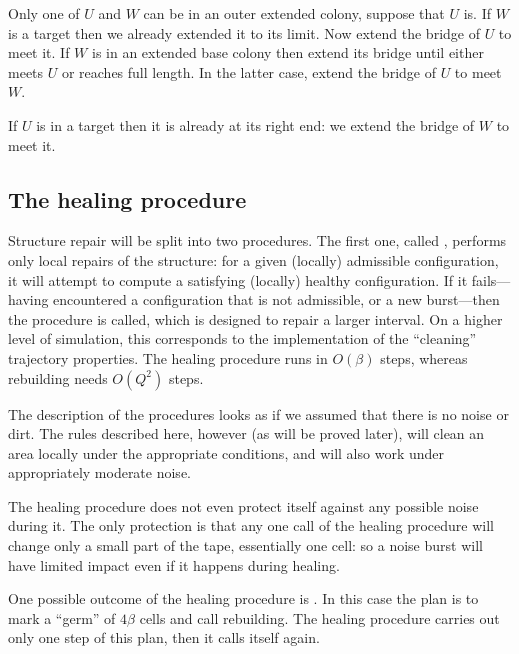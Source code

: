 \documentclass[12pt]{memoir}
\newcommand{\authnote}[3]
{\text{{ \textcolor{#3}{\( \langle\hspace{-0.2em}\langle \)\textsf{\footnotesize #1: #2}\( \rangle\hspace{-0.2em}\rangle \)}}}}
\newcommand{\authnote}[2]{}
\newcommand{\Pnote}[1]{{\authnote{P}{#1}{cyan}}}
\newcommand{\Q}{Q}
\begin{document}
\begin{Proof}
\begin{prooof}
Only one of \( U \) and \( W \) can be in an outer extended colony, suppose that \( U \) is.
If \( W \) is a target then we already extended it to its limit.
Now extend the bridge of \( U \) to meet it.
If \( W \) is in an extended base colony then extend its bridge until either meets \( U \) or
reaches full length.
In the latter case, extend the bridge of \( U \) to meet \( W \).

If \( U \) is in a target then it is already at its right end: we extend the bridge of \( W \) to meet it.
\end{prooof} %
\end{Proof}


\subsection{The healing procedure}\label{sec:healing-proc}

Structure repair will be split into two procedures.
The first one, called , performs
only local repairs of the structure: for a given (locally) admissible configuration,
it will attempt to compute a satisfying (locally) healthy configuration.
If it fails---having encountered a configuration that is not admissible, or
a new burst---then the  procedure is called, which is designed
to repair a larger interval.
On a higher level of simulation, 
this corresponds to the implementation of the ``cleaning'' trajectory properties.
The healing procedure runs in \( O(\beta) \) 
steps, whereas rebuilding needs \( O(\Q^{2}) \) steps. \Pnote{maybe even \( \Q^{3} \)?}

The description of the procedures looks as if we assumed that there is no noise or dirt.
The rules described here, however (as will be proved later), will clean an area locally under the 
appropriate conditions, and will also work under appropriately moderate noise.

The healing procedure does not even protect itself against any possible noise during it.
The only protection is that any one call of the healing procedure will change only 
a small part of the tape, essentially one cell: so a noise burst will have limited impact even if it
happens during healing.

One possible outcome of the healing procedure is . 
In this case the plan is to mark a ``germ'' of \( 4\beta \) cells and call rebuilding.
The healing procedure carries  out only one step of this plan, then it calls itself again.
\end{document}
